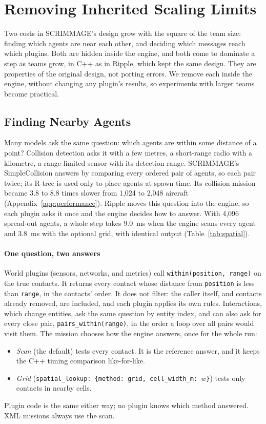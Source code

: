 \documentclass[conference]{IEEEtran}
\begin{document}
\section{Removing Inherited Scaling Limits}
\label{sec:scaling}

Two costs in SCRIMMAGE's design grow with the square of the team size: finding
which agents are near each other, and deciding which messages reach which
plugins. Both are hidden inside the engine, and both come to dominate a step
as teams grow, in C++ as in Ripple, which kept the same design. They are
properties of the original design, not porting errors. We remove each inside
the engine, without changing any plugin's results, so experiments with larger
teams become practical.

\subsection{Finding Nearby Agents}
\label{sec:spatial}

Many models ask the same question: which agents are within some distance of a
point? Collision detection asks it with a few metres, a short-range radio with
a kilometre, a range-limited sensor with its detection range. SCRIMMAGE's
SimpleCollision answers by comparing every ordered pair of agents, so each pair
twice; its R-tree is used only to place agents at spawn time. Its collision
mission became 3.8 to 8.8 times slower from 1{,}024 to 2{,}048
aircraft (Appendix~\ref{app:performance}). Ripple moves this question into the
engine, so each plugin asks it once and the engine decides how to answer. With
4{,}096 spread-out agents, a whole step takes 9.0~ms when the engine
scans every agent and 3.8~ms with the optional grid, with identical output
(Table~\ref{tab:spatial}).

\paragraph{One question, two answers}
World plugins (sensors, networks, and metrics) call
\texttt{within(position, range)} on the true contacts. It returns every
contact whose distance from \texttt{position} is less than \texttt{range},
in the contacts' order. It does not filter: the caller itself, and contacts
already removed, are included, and each plugin applies its own rules.
Interactions, which change entities, ask the same question by entity index,
and can also ask for every close pair, \texttt{pairs\_within(range)}, in the
order a loop over all pairs would visit them.
The mission chooses how the engine answers, once for the whole run:
\begin{itemize}
\item \emph{Scan} (the default) tests every contact. It is the reference
answer, and it keeps the C++ timing comparison like-for-like.
\item \emph{Grid} (\texttt{spatial\_lookup: \{method: grid, cell\_width\_m:
$w$\}}) tests only contacts in nearby cells.
\end{itemize}
Plugin code is the same either way; no plugin knows which method answered.
XML missions always use the scan.
\end{document}
